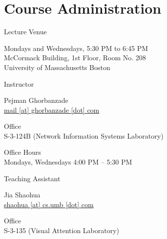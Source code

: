 \documentclass[compress]{beamer}
\begin{document}
\prepareCover

\section{Course Administration}

\begin{slide}
	\begin{block}{Lecture Venue}

	Mondays and Wednesdays, 5:30 PM to 6:45 PM\\
	McCormack Building, 1st Floor, Room No. 208\\
	University of Massachusetts Boston

	\end{block}
\end{slide}

\begin{slide}
	\begin{block}{Instructor}

	Pejman Ghorbanzade\\
	\href{mailto:pejman@ghorbanzade.com}{mail [at] ghorbanzade [dot] com}

	\par
	\vspace{0.5em}
	{\large Office}\\S-3-124B (Network Information Systems Laboratory)

	\par
	\vspace{0.5em}
	{\large Office Hours}\\Mondays, Wednesdays 4:00 PM -- 5:30 PM

	\end{block}
\end{slide}

\begin{slide}
	\begin{block}{Teaching Assistant}

	Jia Shaohua\\
	\href{mailto:shaohua@cs.umb.edu}{shaohua [at] cs.umb [dot] com}

	\par
	\vspace{0.5em}
	{\large{Office}\\S-3-135 (Visual Attention Laboratory)}

	\end{block}
\end{slide}
\end{document}
